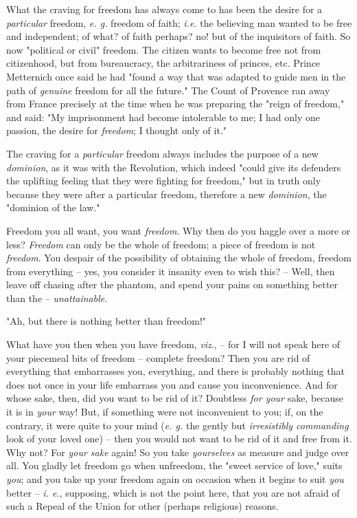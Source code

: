 \documentclass[a4paper]{book}
\begin{document}
What the craving for freedom has always come to has been the desire for a 
\textit{particular} freedom, \textit{e. g.} freedom of faith; \textit{i.e.} 
the believing man wanted to be free and independent; of what? of faith 
perhaps? no! but of the inquisitors of faith. So now "{}political or civil"{} 
freedom. The citizen wants to become free not from citizenhood, but from 
bureaucracy, the arbitrariness of princes, etc. Prince Metternich once said he 
had "{}found a way that was adapted to guide men in the path of 
\textit{genuine} freedom for all the future."{} The Count of Provence ran away 
from France precisely at the time when he was preparing the "{}reign of 
freedom,"{} and said: "{}My imprisonment had become intolerable to me; I had 
only one passion, the desire for \textit{freedom}; I thought only of it."{}

The craving for a \textit{particular} freedom always includes the purpose of a 
new \textit{dominion}, as it was with the Revolution, which indeed "{}could 
give its defenders the uplifting feeling that they were fighting for 
freedom,"{} but in truth only because they were after a particular freedom, 
therefore a new \textit{dominion}, the "{}dominion of the law."{}

Freedom you all want, you want \textit{freedom}. Why then do you haggle over a 
more or less? \textit{Freedom} can only be the whole of freedom; a piece of 
freedom is not \textit{freedom}. You despair of the possibility of obtaining 
the whole of freedom, freedom from everything -- yes, you consider it insanity 
even to wish this? -- Well, then leave off chasing after the phantom, and 
spend your pains on something better than the -- \textit{unattainable}.

"{}Ah, but there is nothing better than freedom!"{}

What have you then when you have freedom, \textit{viz}., -- for I will not 
speak here of your piecemeal bits of freedom -- complete freedom? Then you are 
rid of everything that embarrasses you, everything, and there is probably 
nothing that does not once in your life embarrass you and cause you 
inconvenience. And for whose sake, then, did you want to be rid of it? 
Doubtless \textit{for your} sake, because it is in \textit{your} way! But, if 
something were not inconvenient to you; if, on the contrary, it were quite to 
your mind (\textit{e. g.} the gently but \textit{irresistibly commanding} look 
of your loved one) -- then you would not want to be rid of it and free from 
it. Why not? For \textit{your sake} again! So you take \textit{yourselves} as 
measure and judge over all. You gladly let freedom go when unfreedom, the 
"{}sweet service of love,"{} suits \textit{you}; and you take up your freedom 
again on occasion when it begins to suit \textit{you} better -- \textit{i. 
e.}, supposing, which is not the point here, that you are not afraid of such a 
Repeal of the Union for other (perhaps religious) reasons.
\end{document}
